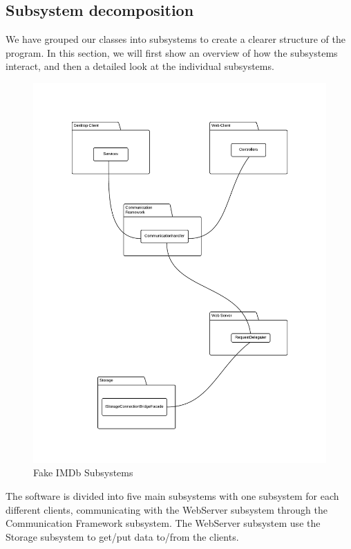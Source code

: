 \subsection{Subsystem decomposition}
\label{sec:Subsystem decomposition}
We have grouped our classes into subsystems to create a clearer structure of the program. In this section, we will first show an overview of how the subsystems interact, and then a detailed look at the individual subsystems.\\


\begin{figure}[H]
\includegraphics[scale=0.2]{img/SDD/FakeIMDbSubsystems.png}
\caption{Fake IMDb Subsystems}
\label{fig:FakeIMDBSubsystems}
\end{figure}

The software is divided into five main subsystems with one subsystem for each different clients, communicating with the WebServer subsystem through the Communication Framework subsystem. The WebServer subsystem use the Storage subsystem to get/put data to/from the clients.\\

